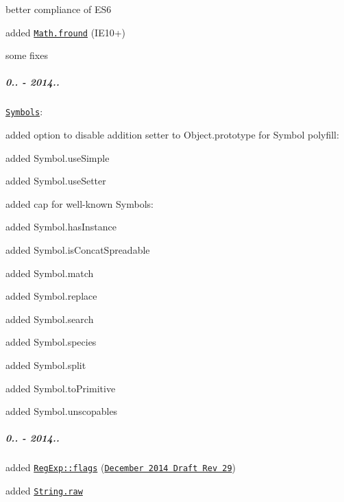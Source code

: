 \begin{DoxyItemize}
\item better compliance of E\+S6
\item added \href{https://github.com/zloirock/core-js/#ecmascript-6-math}{\tt {\ttfamily Math.\+fround}} (I\+E10+)
\item some fixes
\end{DoxyItemize}

\subparagraph*{0.. -\/ 2014..}


\begin{DoxyItemize}
\item \href{https://github.com/zloirock/core-js/#ecmascript-6-symbol}{\tt Symbols}\+:
\begin{DoxyItemize}
\item added option to disable addition setter to {\ttfamily Object.\+prototype} for Symbol polyfill\+:
\begin{DoxyItemize}
\item added {\ttfamily Symbol.\+use\+Simple}
\item added {\ttfamily Symbol.\+use\+Setter}
\end{DoxyItemize}
\item added cap for well-\/known Symbols\+:
\begin{DoxyItemize}
\item added {\ttfamily Symbol.\+has\+Instance}
\item added {\ttfamily Symbol.\+is\+Concat\+Spreadable}
\item added {\ttfamily Symbol.\+match}
\item added {\ttfamily Symbol.\+replace}
\item added {\ttfamily Symbol.\+search}
\item added {\ttfamily Symbol.\+species}
\item added {\ttfamily Symbol.\+split}
\item added {\ttfamily Symbol.\+to\+Primitive}
\item added {\ttfamily Symbol.\+unscopables}
\end{DoxyItemize}
\end{DoxyItemize}
\end{DoxyItemize}

\subparagraph*{0.. -\/ 2014..}


\begin{DoxyItemize}
\item added \href{https://github.com/zloirock/core-js/#ecmascript-6-regexp}{\tt {\ttfamily Reg\+Exp\+::flags}} (\href{http://wiki.ecmascript.org/doku.php?id=harmony:specification_drafts#december_6_2014_draft_rev_29}{\tt December 2014 Draft Rev 29})
\item added \href{https://github.com/zloirock/core-js/#ecmascript-6-string}{\tt {\ttfamily String.\+raw}}
\end{DoxyItemize}

